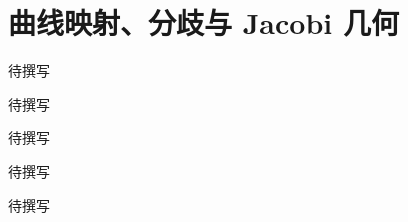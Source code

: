 
% 
% 

\chapter{曲线映射、分歧与 Jacobi 几何}
\label{g5:ch:24}

\begin{chapterabstract}
待撰写
\end{chapterabstract}

\begin{learninggoals}
待撰写
\end{learninggoals}

待撰写






\begin{chaptersummary}
待撰写
\end{chaptersummary}

\BookExercises
待撰写
